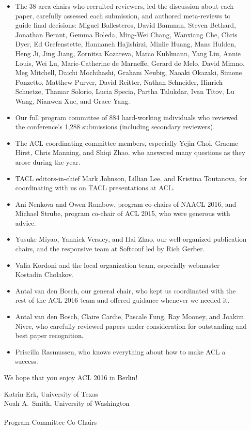 \begin{itemize}
\item The 38 area chairs who recruited reviewers, led the discussion about each paper, carefully assessed each submission, and authored meta-reviews to guide final decisions:
Miguel Ballesteros,
David Bamman,
Steven Bethard,
Jonathan Berant,
Gemma Boleda,
Ming-Wei Chang,
Wanxiang Che,
Chris Dyer,
Ed Grefenstette,
Hannaneh Hajishirzi,
Minlie Huang,
Mans Hulden,
Heng Ji,
Jing Jiang,
Zornitsa Kozareva,
Marco Kuhlmann,
Yang Liu,
Annie Louis,
Wei Lu,
Marie-Catherine de Marneffe,
Gerard de Melo,
David Mimno,
Meg Mitchell,
Daichi Mochihashi,
Graham Neubig,
Naoaki Okazaki,
Simone Ponzetto,
Matthew Purver,
David Reitter,
Nathan Schneider,
Hinrich Schuetze,
Thamar Solorio,
Lucia Specia,
Partha Talukdar,
Ivan Titov,
Lu Wang,
Nianwen Xue, and
Grace Yang.
\item Our full program committee of 884 hard-working individuals who reviewed the conference's 1,288 submissions (including secondary reviewers). 
\item The ACL coordinating committee members, especially Yejin Choi,  Graeme Hirst,  Chris Manning, and Shiqi Zhao, who answered many questions as they arose during the year.
\item TACL editors-in-chief Mark Johnson, Lillian Lee, and Kristina Toutanova, for coordinating with us on TACL presentations at ACL.
\item Ani Nenkova and Owen Rambow, program co-chairs of NAACL 2016, and Michael Strube, program co-chair of ACL 2015, who were generous with advice.
\item Yusuke Miyao, Yannick Versley, and Hai Zhao, our well-organized publication chairs, and the responsive team at Softconf led by Rich Gerber.
\item Valia Kordoni and the local organization team, especially webmaster Kostadin Cholakov.
\item Antal van den Bosch, our general chair, who kept us coordinated with the rest of the ACL 2016 team and offered guidance whenever we needed it.
\item Antal van den Bosch, Claire Cardie, Pascale Fung, Ray Mooney, and Joakim Nivre, who carefully reviewed papers under consideration for outstanding and best paper recognition.
\item Priscilla Rasmussen, who knows everything about how to make ACL a success.
\end{itemize}

We hope that you enjoy ACL 2016 in Berlin!

\vskip 0.5in
\noindent Katrin Erk, University of Texas \\
\noindent Noah A.~Smith, University of Washington \\ \\
Program Committee Co-Chairs

